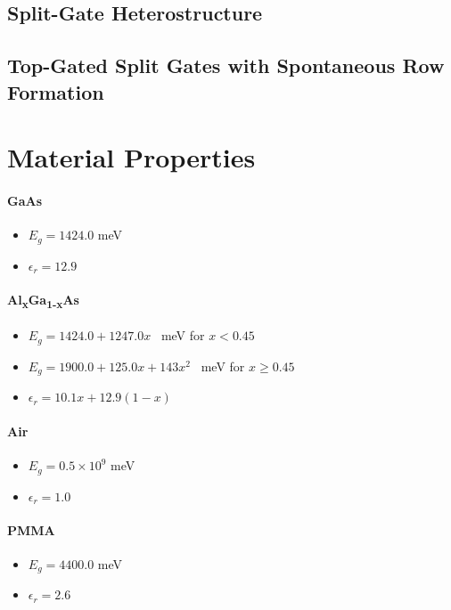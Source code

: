 \documentclass[12pt]{article}
\begin{document}
\subsection{Split-Gate Heterostructure}

\subsection{Top-Gated Split Gates with Spontaneous Row Formation}
\label{subsec:TopAndSplitGate}

\appendix

\section{Material Properties}
\label{app:MaterialProperties}

\paragraph{GaAs}
\begin{itemize}
    \item{$E_g = 1424.0$ meV}
    \item{$\epsilon_r = 12.9$}
\end{itemize}

\paragraph{Al\textsubscript{x}Ga\textsubscript{1-x}As}
\begin{itemize}
    \item{$E_g = 1424.0 + 1247.0 x$ \ meV for $x < 0.45$}
    \item{$E_g = 1900.0 + 125.0 x + 143 x^2$ \ meV for $x \geq 0.45$}
    \item{$\epsilon_r = 10.1 x + 12.9 (1-x)$}
\end{itemize}

\paragraph{Air}
\begin{itemize}
    \item{$E_g = 0.5\times10^9$ meV}
    \item{$\epsilon_r = 1.0$}
\end{itemize}

\paragraph{PMMA}
\begin{itemize}
    \item{$E_g = 4400.0$ meV}
    \item{$\epsilon_r = 2.6$}
\end{itemize}
\end{document}
